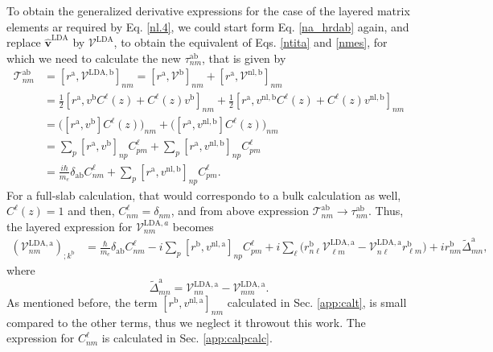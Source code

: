 To obtain the generalized derivative expressions for the case of the layered
matrix elements ar required by Eq. \eqref{nl.4}, we could start form
Eq. \eqref{na_hrdab} again, and replace $\hat{\mathbf{v}}^\mathrm{LDA}$ by
$\boldsymbol{\mathcal{V}}^\mathrm{LDA}$, to obtain the equivalent of
Eqs. \eqref{ntita} and \eqref{nmes}, for which we need to calculate the new
$\tau^{\mathrm{a}\mathrm{b}}_{nm}$, that is given by
\begin{align}\label{na_hrdab-n}
\mathcal{T}^{\mathrm{a}\mathrm{b}}_{nm}&=
[r^{\mathrm{a}},\mathcal{V}^{\mathrm{LDA},\mathrm{b}}]_{nm}
= [r^{\mathrm{a}},\mathcal{V}^\mathrm{b}]_{nm}+
[r^{\mathrm{a}},\mathcal{V}^{\mathrm{nl},\mathrm{b}}]_{nm}
\nonumber\\
&= \frac{1}{2}
[r^{\mathrm{a}},v^\mathrm{b} C^{\ell}(z)+C^{\ell}(z) v^\mathrm{b}]_{nm} 
+ \frac{1}{2}
[r^{\mathrm{a}},v^{\mathrm{nl},\mathrm{b}}C^{\ell}(z)+C^{\ell}(z) v^{\mathrm{nl},\mathrm{b}}]_{nm} 
\nonumber\\
&=
\Big([r^{\mathrm{a}},v^\mathrm{b}]C^{\ell}(z)\Big)_{nm} 
+
\Big(
[r^{\mathrm{a}},v^{\mathrm{nl},\mathrm{b}}] C^{\ell}(z)\Big)_{nm} 
\nonumber\\
&=
\sum_p[r^{\mathrm{a}},v^\mathrm{b}]_{np}C^{\ell}_{pm} 
+
\sum_p 
[r^{\mathrm{a}},v^{\mathrm{nl},\mathrm{b}}]_{np}C^{\ell}_{pm} 
\nonumber\\
&=
\frac{i\hbar}{m_e}\delta_{\mathrm{a}\mathrm{b}} C^{\ell}_{nm} 
+
\sum_p 
[r^{\mathrm{a}},v^{\mathrm{nl},\mathrm{b}}]_{np}C^{\ell}_{pm} 
.
\end{align} 
For a full-slab calculation, that would correspondo to a bulk calculation as well, $C^{\ell}(z)=1$ and then, $C^{\ell}_{nm}=\delta_{nm}$, and from above expression $\mathcal{T}^{\mathrm{a}\mathrm{b}}_{nm}\to \tau^{\mathrm{a}\mathrm{b}}_{nm}$. Thus, the layered expression for $\mathcal{V}^{\mathrm{LDA},a}_{nm}$ becomes
\begin{align}\label{nmesn}
(\mathcal{V}^{\mathrm{LDA},\mathrm{a}}_{nm})_{;k^{\mathrm{b}}}&=
\frac{\hbar}{m_e}\delta_{\mathrm{a}\mathrm{b}}
C^{\ell}_{nm} 
-i
\sum_p 
[r^{\mathrm{b}},v^{\mathrm{nl},\mathrm{a}}]_{np}C^{\ell}_{pm} 
+i
\sum_{\ell}
\bigg(
r^{\mathrm{b}}_{n\ell}  
\mathcal{V}^{\mathrm{LDA},\mathrm{a}}_{\ell m}
-
\mathcal{V}^{\mathrm{LDA},\mathrm{a}}_{n\ell}   
r^{\mathrm{b}}_{\ell m}
\bigg)  
+i  
r^{\mathrm{b}}_{nm}
\tilde\Delta^{\mathrm{a}}_{mn}
,
\end{align}  
where
\begin{equation}\label{tdel}
\tilde\Delta^{\mathrm{a}}_{mn}
=
\mathcal{V}^{\mathrm{LDA},\mathrm{a}}_{nn}  
-
\mathcal{V}^{\mathrm{LDA},\mathrm{a}}_{mm}  
.
\end{equation}
As mentioned before, the term $[r^{\mathrm{b}},v^{\mathrm{nl},\mathrm{a}}]_{nm}$ calculated in Sec. \ref{app:calt}, is small compared to the other terms, thus we neglect it throwout this work.\cite{valerie} The expression for $C^{\ell}_{nm}$ is calculated in Sec. \ref{app:calpcalc}.


